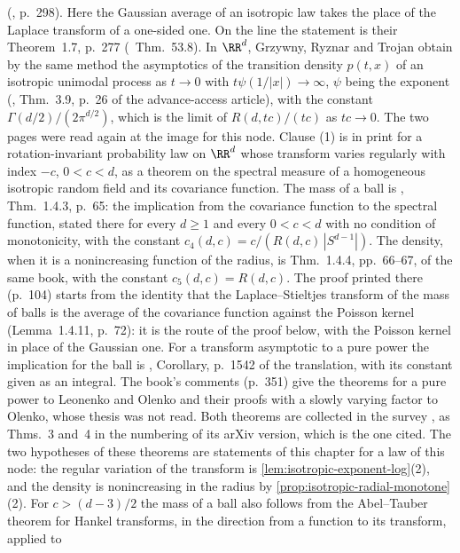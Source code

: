 \begin{proposition}
{(, p.~298).
Here the Gaussian average of an isotropic law takes the place of the Laplace transform of a
one-sided one. On the line the statement is their Theorem~1.7, p.~277
(~Thm.~53.8). In $\RR^d$, Grzywny, Ryznar and Trojan obtain by the same
method the asymptotics of the transition density $p(t,x)$ of an isotropic unimodal \Levy{}
process as $t \to 0$ with $t\psi(1/|x|) \to \infty$, $\psi$ being the exponent
(, Thm.~3.9, p.~26 of the advance-access article), with the
constant $\Gamma(d/2)/(2\pi^{d/2})$, which is the limit of $R(d,tc)/(tc)$ as $tc \to 0$. The two
pages were read again at the image for this node. Clause (1) is in print for a
rotation-invariant probability law on $\RR^d$ whose transform varies regularly with index $-c$,
$0 < c < d$, as a theorem on the spectral measure of a homogeneous isotropic random field and
its covariance function. The mass of a ball is , Thm.~1.4.3, p.~65:
the implication from the covariance function to the spectral function, stated there for every
$d \ge 1$ and every $0 < c < d$ with no condition of monotonicity, with the constant
$c_4(d,c) = c/(R(d,c)\,|S^{d-1}|)$. The density, when it is a nonincreasing function of the
radius, is Thm.~1.4.4, pp.~66--67, of the same book, with the constant $c_5(d,c) = R(d,c)$. The
proof printed there (p.~104) starts from the identity that the Laplace--Stieltjes transform of
the mass of balls is the average of the covariance function against the Poisson kernel
(Lemma~1.4.11, p.~72): it is the route of the proof below, with the Poisson kernel in place of
the Gaussian one. For a transform asymptotic to a pure power the implication for the ball is
, Corollary, p.~1542 of the translation, with its constant given
as an integral. The book's comments (p.~351) give the theorems for a pure power to Leonenko and
Olenko and their proofs with a slowly varying factor to Olenko, whose thesis was not read. Both
theorems are collected in the survey , as Thms.~3 and~4 in the
numbering of its arXiv version, which is the one cited. The two hypotheses of these theorems are statements of this chapter for a law of
this node: the regular variation of the transform is \ref{lem:isotropic-exponent-log}(2), and
the density is nonincreasing in the radius by \ref{prop:isotropic-radial-monotone}(2). For
$c > (d-3)/2$ the mass of a ball also follows from the Abel--Tauber theorem for Hankel
transforms, in the direction from a function to its transform, applied to
}
\end{proposition}

